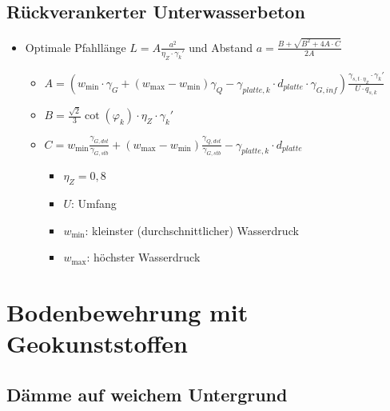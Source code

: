 \documentclass[fleqn,twoside]{article}
\begin{document}
\subsection{Rückverankerter Unterwasserbeton}
\begin{itemize}
    \item Optimale Pfahllänge $L=A\frac{a^2}{\eta_Z\cdot\gamma_k'}$ und Abstand $a=\frac{B+\sqrt{B^2+4A\cdot C}}{2A}$
    \begin{itemize}
        \item $A=(w_{\min}\cdot \gamma_G+(w_{\max}-w_{\min})\gamma_Q-\gamma_{platte,k}\cdot d_{platte}\cdot \gamma_{G,inf})\frac{\gamma_{s,t\cdot\eta_Z}\cdot\gamma_k'}{U\cdot q_{s,k}}$
        \item $B=\frac{\sqrt{2}}{3}\cot(\varphi_k)\cdot\eta_Z\cdot\gamma_k'$
        \item $C=w_{\min}\frac{\gamma_{G,dst}}{\gamma_{G,stb}}+(w_{\max}-w_{\min})\frac{\gamma_{Q,dst}}{\gamma_{G,stb}}-\gamma_{platte,k}\cdot d_{platte}$
        \begin{itemize}
            \item $\eta_Z=0,8$
            \item $U$: Umfang
            \item $w_{\min}$: kleinster (durchschnittlicher) Wasserdruck
            \item $w_{\max}$: höchster Wasserdruck
        \end{itemize}
    \end{itemize}
\end{itemize}



\section{Bodenbewehrung mit Geokunststoffen}

\subsection{Dämme auf weichem Untergrund}
\end{document}
